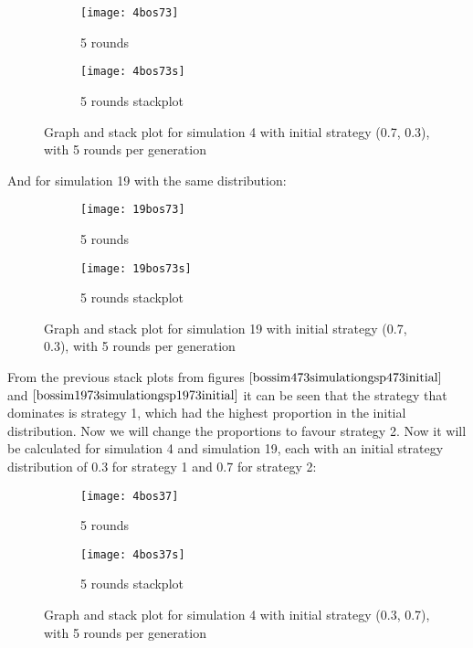 \begin{figure}[H]       
    \centering
    \begin{subfigure}[b]{0.3\textwidth}
	\centering
	{\texttt{[image: 4bos73]}}   
    	\caption{5 rounds}
	\label{fig:bossim473}
    \end{subfigure}
    \hfill
    \begin{subfigure}[b]{0.3\textwidth}
	\centering
	{\texttt{[image: 4bos73s]}}   
    	\caption{5 rounds stackplot}
	\label{fig:bossim473s}
    \end{subfigure}
    \caption{Graph and stack plot for simulation 4 with initial strategy (0.7, 0.3), with 5 rounds per generation}
    \label{bossim473simulationgsp473initial}
\end{figure}

And for simulation 19 with the same distribution:
\begin{figure}[H]       
    \centering
    \begin{subfigure}[b]{0.3\textwidth}
	\centering
	{\texttt{[image: 19bos73]}}   
    	\caption{5 rounds}
	\label{fig:bossim1973}
    \end{subfigure}
    \hfill
    \begin{subfigure}[b]{0.3\textwidth}
	\centering
	{\texttt{[image: 19bos73s]}}   
    	\caption{5 rounds stackplot}
	\label{fig:bossim1973s}
    \end{subfigure}
    \caption{Graph and stack plot for simulation 19 with initial strategy (0.7, 0.3), with 5 rounds per generation}
    \label{bossim1973simulationgsp1973initial}
\end{figure}
From the previous stack plots from figures $\ref{bossim473simulationgsp473initial}$ and $\ref{bossim1973simulationgsp1973initial}$ it can be seen that the strategy that dominates is strategy 1, which had the highest proportion in the initial distribution. Now we will change the proportions to favour strategy 2.
Now it will be calculated for simulation 4 and simulation 19, each with an initial strategy distribution of 0.3 for strategy 1 and 0.7 for strategy 2:

\begin{figure}[H]       
    \centering
    \begin{subfigure}[b]{0.3\textwidth}
	\centering
	{\texttt{[image: 4bos37]}}   
    	\caption{5 rounds}
	\label{fig:bossim437}
    \end{subfigure}
    \hfill
    \begin{subfigure}[b]{0.3\textwidth}
	\centering
	{\texttt{[image: 4bos37s]}}   
    	\caption{5 rounds stackplot}
	\label{fig:bossim437s}
    \end{subfigure}
    \caption{Graph and stack plot for simulation 4 with initial strategy (0.3, 0.7), with 5 rounds per generation}
    \label{bossim437simulationgsp437initial}
\end{figure}

